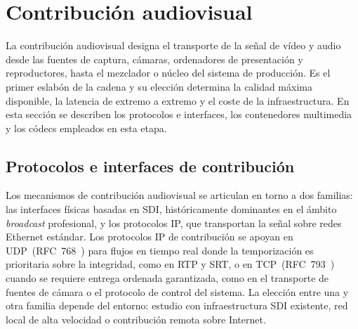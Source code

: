\section{Contribución audiovisual}
\label{sec:contribucion_av}

La contribución audiovisual designa el transporte de la señal de vídeo y audio desde
las fuentes de captura, cámaras, ordenadores de presentación y reproductores, hasta
el mezclador o núcleo del sistema de producción. Es el primer eslabón de la cadena y
su elección determina la calidad máxima disponible, la latencia de extremo a extremo
y el coste de la infraestructura. En esta sección se describen los protocolos e
interfaces, los contenedores multimedia y los códecs empleados en esta etapa.

\subsection{Protocolos e interfaces de contribución}

Los mecanismos de contribución audiovisual se articulan en torno a dos familias: las
interfaces físicas basadas en SDI, históricamente dominantes en el ámbito \textit{broadcast}
profesional, y los protocolos IP, que transportan la señal sobre redes Ethernet estándar.
Los protocolos IP de contribución se apoyan en \ac{UDP}~(RFC~768~\cite{rfc768_udp}) para
flujos en tiempo real donde la temporización es prioritaria sobre la integridad, como en
RTP y SRT, o en \ac{TCP}~(RFC~793~\cite{rfc793_tcp}) cuando se requiere entrega ordenada
garantizada, como en el transporte de fuentes de cámara o el protocolo de control del
sistema. La elección entre una y otra familia depende del entorno: estudio con
infraestructura SDI existente, red local de alta velocidad o contribución remota
sobre Internet.

